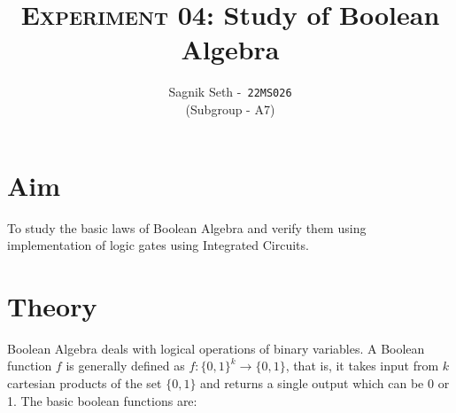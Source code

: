 \documentclass{scrartcl}
\title{
        \Large\textsc{Experiment 04: }
        \huge\textbf{Study of Boolean Algebra} \\
}
\author{{\Large Sagnik Seth} -\   \texttt{22MS026}\\ ({\small Subgroup - A7}) }
\date{}
\begin{document}
\maketitle
\section{Aim}
To study the basic laws of Boolean Algebra and verify them using implementation of logic gates using Integrated Circuits.
\section{Theory}
Boolean Algebra deals with logical operations of binary variables. A Boolean function $f$ is generally defined as $f: \{0,1\}^k \rightarrow \{0,1\} $, that is, it takes input from $k$ cartesian products of the set $\{0,1\}$ and returns a single output which can be 0 or 1. The basic boolean functions are: 
\end{document}
